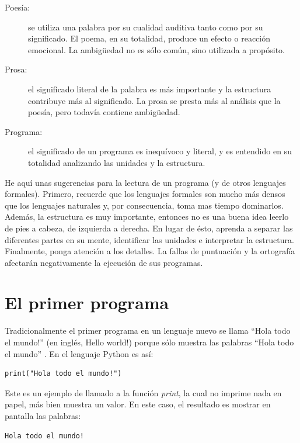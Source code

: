  
\begin{description}
\item [{Poesía:}] se utiliza una palabra por su cualidad auditiva tanto
como por su significado. El poema, en su totalidad, produce un efecto
o reacción emocional. La ambigüedad no es sólo común, sino utilizada
a propósito.
\item [{Prosa:}] el significado literal de la palabra es más importante
y la estructura contribuye más al significado. La prosa se presta
más al análisis que la poesía, pero todavía contiene ambigüedad.
\item [{Programa:}] el significado de un programa es inequívoco y literal,
y es entendido en su totalidad analizando las unidades y la estructura.
\end{description}
He aquí unas sugerencias para la lectura de un programa (y de otros
lenguajes formales). Primero, recuerde que los lenguajes formales
son mucho más densos que los lenguajes naturales y, por consecuencia,
toma mas tiempo dominarlos. Además, la estructura es muy importante,
entonces no es una buena idea leerlo de pies a cabeza, de izquierda
a derecha. En lugar de ésto, aprenda a separar las diferentes partes
en su mente, identificar las unidades e interpretar la estructura.
Finalmente, ponga atención a los detalles. La fallas de puntuación
y la ortografía afectarán negativamente la ejecución de sus programas.

\section{El primer programa}

\label{hello} \label{hello world}

Tradicionalmente el primer programa en un lenguaje nuevo se llama
``Hola todo el mundo!'' (en inglés, Hello world!) porque sólo muestra
las palabras ``Hola todo el mundo'' . En el lenguaje Python es así:

\begin{verbatim}
print("Hola todo el mundo!")
\end{verbatim}

Este es un ejemplo de llamado a la función {\em print}, la cual
no imprime nada en papel, más bien muestra un valor. En este caso,
el resultado es mostrar en pantalla las palabras:

\begin{verbatim}
Hola todo el mundo!
\end{verbatim}

